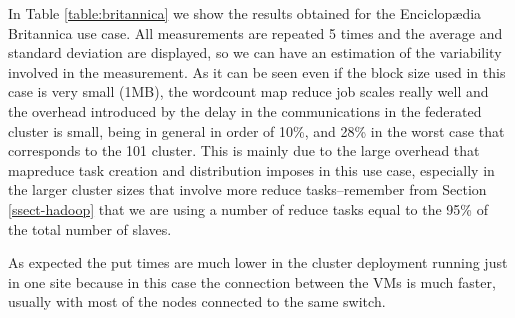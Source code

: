 \documentclass[oribibl]{llncs_Ibergrid2013}
\begin{document}
In Table \ref{table:britannica} we show the results obtained for the Enciclop{\ae}dia Britannica use case. All measurements are repeated 5 times and the average and standard deviation are displayed, so we can have an estimation of the variability involved in the measurement. As it can be seen even if the block size used in this case is very small (1MB), the wordcount map reduce job scales really well and the overhead introduced by the delay in the communications in the federated cluster is small, being in general in order of 10\%, and 28\% in the worst case that corresponds to the 101 cluster. This is mainly due to the large overhead that mapreduce task creation and distribution imposes in this use case, especially in the larger cluster sizes that involve more reduce tasks--remember from Section \ref{ssect-hadoop} that we are using a number of reduce tasks equal to the 95\% of the total number of slaves.

As expected the put times are much lower in the cluster deployment running just in one site because in this case the connection between the VMs is much faster, usually with most of the nodes connected to the same switch.
\end{document}
